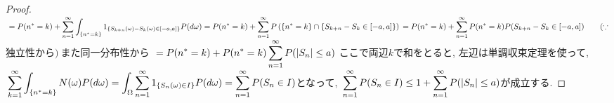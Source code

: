 \documentclass{jsarticle}
\begin{document}
\begin{proof}
$\displaystyle \\ = P( n^{*} = k ) + \sum_{n=1}^{\infty} \int_{ \left\{ n^{*} = k \right\} } {1_{ \left\{ S_{k+n}(\omega) - S_{k}(\omega) \in \left[-a,a\right] \right\}  } P (d\omega) } = P( n^{*} = k ) + \sum_{n=1}^{\infty} P\left( \left\{ n^{*}=k \right\} \cap  \left\{ S_{k+n} - S_{k} \in \left[-a,a\right] \right\}  \right) \\ =  P( n^{*} = k ) +  \sum_{n=1}^{\infty} P(n^{*} = k) P (S_{k+n} - S_{k} \in \left[-a,a\right]) \qquad ( \because$  独立性から$) \ $また同一分布性から 
$\displaystyle \\ = P( n^{*} = k ) + P(n^{*} = k) \sum_{n=1}^{\infty} P ( \left| S_{n} \right| \le a)$ ここで両辺$k$で和をとると, 左辺は単調収束定理を使って,
$\displaystyle \\ \sum_{k=1}^{\infty} \int_{ \left\{ n^{*} = k \right\} }{N(\omega) P (d\omega)} = \int_{ \Omega }{\sum_{n=1}^{\infty} 1_{ \left\{ S_{n}(\omega) \in I \right\} } P (d\omega)} = \sum_{n=1}^{\infty} P(S_{n} \in I )$となって,
$\displaystyle \\ \sum_{n=1}^{\infty} P(S_{n} \in I ) \le 1 + \sum_{n=1}^{\infty} P ( \left| S_{n} \right| \le a)$が成立する.
\end{proof}
 
\end{document}
